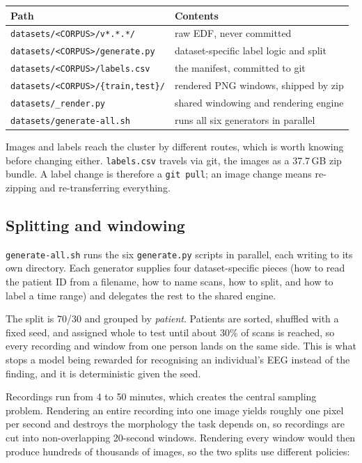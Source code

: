 \documentclass[11pt,a4paper]{article}
\newcommand{\file}[1]{{\small\texttt{#1}}}
\begin{document}
\begin{center}\small
\begin{tabular}{@{}ll@{}}
\toprule
\textbf{\sffamily Path} & \textbf{\sffamily Contents} \\
\midrule
\file{datasets/<CORPUS>/v*.*.*/} & raw EDF, never committed \\
\file{datasets/<CORPUS>/generate.py} & dataset-specific label logic and split \\
\file{datasets/<CORPUS>/labels.csv} & the manifest, committed to git \\
\file{datasets/<CORPUS>/\{train,test\}/} & rendered PNG windows, shipped by zip \\
\file{datasets/\_render.py} & shared windowing and rendering engine \\
\file{datasets/generate-all.sh} & runs all six generators in parallel \\
\bottomrule
\end{tabular}
\end{center}

Images and labels reach the cluster by different routes, which is worth knowing
before changing either. \file{labels.csv} travels via git, the images as a
37.7\,GB zip bundle. A label change is therefore a \texttt{git pull}; an image
change means re-zipping and re-transferring everything.

\subsection{Splitting and windowing}

\file{generate-all.sh} runs the six \file{generate.py} scripts in parallel, each
writing to its own directory. Each generator supplies four dataset-specific
pieces (how to read the patient ID from a filename, how to name scans, how to
split, and how to label a time range) and delegates the rest to the shared
engine.

The split is 70/30 and grouped by \emph{patient}. Patients are sorted, shuffled
with a fixed seed, and assigned whole to test until about 30\% of scans is
reached, so every recording and window from one person lands on the same side.
This is what stops a model being rewarded for recognising an individual's EEG
instead of the finding, and it is deterministic given the seed.

Recordings run from 4 to 50 minutes, which creates the central sampling problem.
Rendering an entire recording into one image yields roughly one pixel per second
and destroys the morphology the task depends on, so recordings are cut into
non-overlapping 20-second windows. Rendering every window would then produce
hundreds of thousands of images, so the two splits use different policies:
\end{document}
